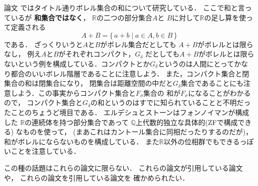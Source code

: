 \documentclass[leqno, a4paper, 12pt]{jsarticle}
\newcommand{\qq}{\mathbb{Q}}
\newcommand{\rr}{\mathbb{R}}
\begin{document}
論文
\cite{MR0260958}
ではタイトル通りボレル集合の和について研究している．
ここで和と言っているが
\textbf{和集合ではなく}，
$\rr$の二つの部分集合$A$と
$B$に対して$\rr$の足し算を使って定義される
\[
A+B=\{\, a+b\mid a\in A, b\in B\, \}
\]
である．
ざっくりいうと$A$と$B$がボレル集合だとしても
$A+B$がボレルとは限らなし，
例え$A$と$B$がそれぞれコンパクト，$G_{\delta}$
だとしても$A+B$がボレルとは限らないという例を構成している．コンパクトとか$G_{\delta}$というのは人間にとってかなり都合のいいボレル階層であることに注意しよう．
また，コンパクト集合と閉集合の和は閉集合になり，
閉集合は距離空間の中だと$G_{\delta}$集合であることにも注意しよう．この事実からコンパクト集合と$F_{\sigma}$集合の
和が$F_{\sigma}$になることがわかるので，
コンパクト集合と$G_{\delta}$の和というのはすでに知られていることと不明だったことのちょうど境目である．
エルデシュとストーンはフォンノイマンが構成した
$\rr$の連続体を持つ部分集合であって
$\qq$上代数的独立な具体的(ZFで構成できる)
なものを使って，
(まあこれはカントール集合に同相だったりするのだが)，
和がボレルにならないものを構成している．
また$\rr$以外の位相群でもできるっぽいことを注意している．


この種の話題はこれらの論文に限らない．
これらの論文が引用している論文や，
これらの論文を引用している論文を
確かめられたい．

\nocite{*}


\end{document}
